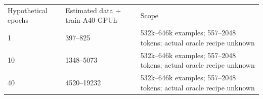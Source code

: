 \begin{tabular}{lll}
\hline
Hypothetical epochs & Estimated data + train A40 GPUh & Scope \\
1 & 397–825 & 532k–646k examples; 557–2048 tokens; actual oracle recipe unknown \\
10 & 1348–5073 & 532k–646k examples; 557–2048 tokens; actual oracle recipe unknown \\
40 & 4520–19232 & 532k–646k examples; 557–2048 tokens; actual oracle recipe unknown \\
\hline
\end{tabular}
